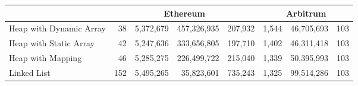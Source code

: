 \begin{table*}[t]
\begin{tabular} {|l|r|r|r|r|r|r|r|}
\multicolumn{1}{|c|}{} &                                                            \multicolumn{4}{c|}{\textbf{Ethereum}}&                                                                                                            \multicolumn{3}{c|}{\textbf{Arbitrum}} 														\\ \hline
Heap with Dynamic Array      				& 38            		& 5,372,679                   	& 457,326,935      	& 207,932     						& 1,544					& 46,705,693					& 103								\\ \hline
Heap with Static Array       					& 42            		& 5,247,636                  	& 333,656,805        	 & 197,710        					& 1,402					& 46,311,418					& 103									 \\ \hline
Heap with Mapping 						& 46           	 	& 5,285,275                     	& 226,499,722    		& 215,040           					& 1,339					& 50,395,993					& 103									\\ \hline
Linked List                     					& 152            		& 5,495,265                     	& 35,823,601         	& 735,243             				& 1,325					& 99,514,286					& 103									\\ \hline

\end{tabular}
\end{table*}
